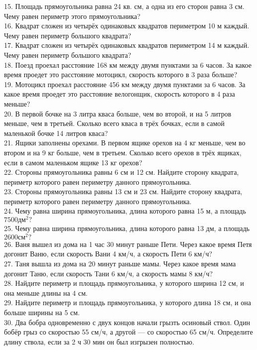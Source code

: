 15. Площадь прямоугольника равна 24 кв. см, а одна из его сторон равна 3 см. Чему равен периметр этого прямоугольника?\\
16. Квадрат сложен из четырёх одинаковых квадратов периметром 10 м каждый. Чему равен периметр большого квадрата?\\
17. Квадрат сложен из четырёх одинаковых квадратов периметром 14 м каждый. Чему равен периметр большого квадрата?\\
18. Поезд проехал расстояние 168 км между двумя пунктами за 6 часов. За какое время проедет это расстояние мотоцикл, скорость которого в 3 раза больше?\\
19. Мотоцикл проехал расстояние 456 км между двумя пунктами за 6 часов. За какое время проедет это расстояние велогонщик, скорость которого в 4 раза меньше?\\
20. В первой бочке на 3 литра кваса больше, чем во второй, и на 5 литров меньше, чем в третьей. Сколько всего кваса в трёх бочках, если в самой маленькой бочке 14 литров кваса?\\
21. Ящики заполнены орехами. В первом ящике орехов на 4 кг меньше, чем во втором и на 9 кг больше, чем в третьем. Сколько всего орехов в трёх ящиках, если в самом маленьком ящике 13 кг орехов?\\
22. Стороны прямоугольника равны 6 см и 12 см. Найдите сторону квадрата, периметр которого равен периметру данного прямоугольника.\\
23. Стороны прямоугольника равны 13 см и 23 см. Найдите сторону квадрата, периметр которого равен периметру данного прямоугольника.\\
24. Чему равна ширина прямоугольника, длина которого равна 15 м, а площадь $7500\text{дм}^2?$\\
25. Чему равна ширина прямоугольника, длина которого равна 13 дм, а площадь $2600\text{см}^2?$\\
26. Ваня вышел из дома на 1 час 30 минут раньше Пети. Через какое время Петя догонит Ваню, если скорость Вани 4 км/ч, а скорость Пети 6 км/ч?\\
27. Таня вышла из дома на 20 минут раньше мамы. Через какое время мама догонит Таню, если скорость Тани 6 км/ч, а скорость мамы 8 км/ч?\\
28. Найдите периметр и площадь прямоугольника, у которого ширина 12 см, и она меньше длины на 4 см.\\
29. Найдите периметр и площадь прямоугольника, у которого длина 18 см, и она больше ширины на 5 см.\\
30. Два бобра одновременно с двух концов начали грызть осиновый ствол. Один бобёр грыз со скоростью 55 см/ч, а другой --- со скоростью 65 см/ч. Определите длину ствола, если за 2 ч 30 мин он был изгрызен полностью.\\
